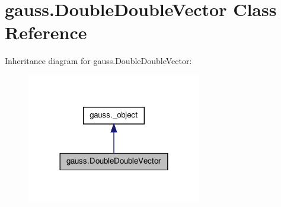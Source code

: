 \hypertarget{classgauss_1_1_double_double_vector}{\section{gauss.\-Double\-Double\-Vector Class Reference}
\label{classgauss_1_1_double_double_vector}
}


Inheritance diagram for gauss.\-Double\-Double\-Vector\-:\nopagebreak
\begin{figure}[H]
\begin{center}
\leavevmode
\includegraphics[width=216pt]{classgauss_1_1_double_double_vector__inherit__graph}
\end{center}
\end{figure}
